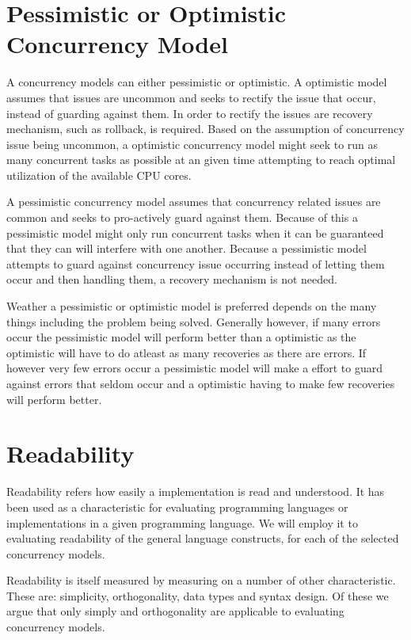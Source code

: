 \section{Pessimistic or Optimistic Concurrency Model}
A concurrency models can either pessimistic or optimistic. A optimistic model assumes that issues are uncommon and seeks to rectify the issue that occur, instead of guarding against them. In order to rectify the issues are recovery mechanism, such as rollback, is required. Based on the assumption of concurrency issue being uncommon, a optimistic concurrency model might seek to run as many concurrent tasks as possible at an given time attempting to reach optimal utilization of the available \ac{CPU} cores. 

A pessimistic concurrency model assumes that concurrency related issues are common and seeks to pro-actively guard against them. Because of this a pessimistic model might only run concurrent tasks when it can be guaranteed that they can will interfere with one another. Because a pessimistic model attempts to guard against concurrency issue occurring instead of letting them occur and then handling them, a recovery mechanism is not needed.

Weather a pessimistic or optimistic model is preferred depends on the many things including the problem being solved. Generally however, if many errors occur the pessimistic model will perform better than a optimistic as the optimistic will have to do atleast as many recoveries as there are errors. If however very few errors occur a pessimistic model will make a effort to guard against errors that seldom occur and a optimistic having to make few recoveries will perform better.

\section{Readability}\label{sec:readability}
Readability refers how easily a implementation is read and understood\cite[p. 8]{sebestaProLang}. It has been used as a characteristic for evaluating programming languages or implementations in a given programming language. We will employ it to evaluating readability of the general language constructs, for each of the selected concurrency models.

Readability is itself measured by measuring on a number of other characteristic. These are: simplicity, orthogonality, data types and syntax design. Of these we argue that only simply and orthogonality are applicable to evaluating concurrency models.

